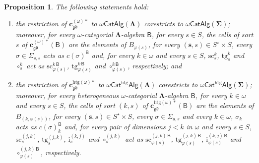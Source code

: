 \documentclass[a4paper, reqno]{amsbook}
\newcommand{\sig}[1]{\mathbf{#1}}             %
\newcommand{\calg}[1]{\boldsymbol{\mathsf{#1}}} %
\newcommand{\gd}{\mathfrak{gd}}              %
\newcommand{\htg}{\mathrm{htg}}                %
\newcommand{\src}{\mathrm{sc}}
\newcommand{\tgt}{\mathrm{tg}}
\theoremstyle{plain}
\newtheorem{proposition}[theorem]{Proposition}
\theoremstyle{definition}
\begin{document}
\begin{proposition}\label{PChangeSigEpVarietyOmega}
The following statements hold:
\begin{enumerate}
\item the restriction of $\mathbf{c}^{(\omega)\ast}_{\gd}$ to $\omega\mathsf{CatAlg}(\sig{\Lambda})$ corestricts to $\omega\mathsf{CatAlg}(\sig{\Sigma})$; moreover, for every $\omega$-categorial $\sig{\Lambda}$-algebra $\calg{B}$, for every $s\in S$, the cells of sort $s$ of $\mathbf{c}^{(\omega)\ast}_{\gd}(\calg{B})$ are the elements of $B_{\varphi(s)}$, for every $(\mathbf{s},s)\in S^{\star}\times S$, every $\sigma\in\Sigma_{\mathbf{s},s}$ acts as $c(\sigma)^{\calg{B}}$ and, for every $k\in\omega$ and every $s\in S$, $\src^{k}_{s}$, $\tgt^{k}_{s}$ and $\circ^{k}_{s}$ act as $\src^{k\,\calg{B}}_{\varphi(s)}$, $\tgt^{k\,\calg{B}}_{\varphi(s)}$ and $\circ^{k\,\calg{B}}_{\varphi(s)}$, respectively; and
\item the restriction of $\mathbf{c}^{\htg(\omega)\ast}_{\gd}$ to $\omega\mathsf{Cat}^{\htg}\mathsf{Alg}(\sig{\Lambda})$ corestricts to $\omega\mathsf{Cat}^{\htg}\mathsf{Alg}(\sig{\Sigma})$; moreover, for every heterogeneous $\omega$-categorial $\sig{\Lambda}$-algebra $\calg{B}$, for every $k\in\omega$ and every $s\in S$, the cells of sort $(k,s)$ of $\mathbf{c}^{\htg(\omega)\ast}_{\gd}(\calg{B})$ are the elements of $B_{(k,\varphi(s))}$, for every $(\mathbf{s},s)\in S^{\star}\times S$, every $\sigma\in\Sigma_{\mathbf{s},s}$ and every $k\in\omega$, $\sigma_{k}$ acts as $c(\sigma)_{k}^{\calg{B}}$ and, for every pair of dimensions $j<k$ in $\omega$ and every $s\in S$, $\src^{(j,k)}_{s}$, $\tgt^{(j,k)}_{s}$, $\mathrm{i}^{(k,j)}_{s}$ and $\circ^{(j,k)}_{s}$ act as $\src^{(j,k)\,\calg{B}}_{\varphi(s)}$, $\tgt^{(j,k)\,\calg{B}}_{\varphi(s)}$, $\mathrm{i}^{(k,j)\,\calg{B}}_{\varphi(s)}$ and $\circ^{(j,k)\,\calg{B}}_{\varphi(s)}$, respectively.
\end{enumerate}
\end{proposition}
\end{document}
